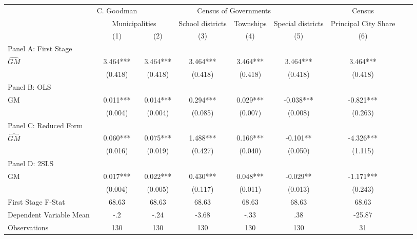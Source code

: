  \begin{tabular}{l*{8}{c}} \toprule
&\multicolumn{1}{c}{C. Goodman}&\multicolumn{4}{c}{Census of Governments}&\multicolumn{1}{c}{Census}\\\cmidrule(lr){2-2}\cmidrule(lr){3-6}\cmidrule(lr){7-7}
&\multicolumn{2}{c}{Municipalities}&\multicolumn{1}{c}{School districts}&\multicolumn{1}{c}{Townships}&\multicolumn{1}{c}{Special districts}&\multicolumn{1}{c}{Principal City Share}\\\cmidrule(lr){2-3}\cmidrule(lr){4-6}\cmidrule(lr){7-7}
&\multicolumn{1}{c}{(1)}&\multicolumn{1}{c}{(2)}&\multicolumn{1}{c}{(3)}&\multicolumn{1}{c}{(4)}&\multicolumn{1}{c}{(5)}&\multicolumn{1}{c}{(6)}\\
\cmidrule(lr){1-7}
\multicolumn{6}{l}{Panel A: First Stage}\\
\cmidrule(lr){1-7}
$\widehat{GM}$  &    3.464***&    3.464***&    3.464***&    3.464***&    3.464***&    3.464***\\
                &  (0.418)   &  (0.418)   &  (0.418)   &  (0.418)   &  (0.418)   &  (0.418)   \\
\cmidrule(lr){1-7}
\multicolumn{6}{l}{Panel B: OLS}\\
\cmidrule(lr){1-7}
GM              &    0.011***&    0.014***&    0.294***&    0.029***&   -0.038***&   -0.821***\\
                &  (0.004)   &  (0.004)   &  (0.085)   &  (0.007)   &  (0.008)   &  (0.263)   \\
\cmidrule(lr){1-7}
\multicolumn{6}{l}{Panel C: Reduced Form}\\
\cmidrule(lr){1-7}
$\widehat{GM}$  &    0.060***&    0.075***&    1.488***&    0.166***&   -0.101** &   -4.326***\\
                &  (0.016)   &  (0.019)   &  (0.427)   &  (0.040)   &  (0.050)   &  (1.115)   \\
\cmidrule(lr){1-7}
\multicolumn{6}{l}{Panel D: 2SLS}\\
\cmidrule(lr){1-7}
GM              &    0.017***&    0.022***&    0.430***&    0.048***&   -0.029** &   -1.171***\\
                &  (0.004)   &  (0.005)   &  (0.117)   &  (0.011)   &  (0.013)   &  (0.243)   \\
\midrule
First Stage F-Stat&    68.63   &    68.63   &    68.63   &    68.63   &    68.63   &    68.63   \\
Dependent Variable Mean&      -.2   &     -.24   &    -3.68   &     -.33   &      .38   &   -25.87   \\
Observations    &      130   &      130   &      130   &      130   &      130   &       31   \\
       \bottomrule \end{tabular}
